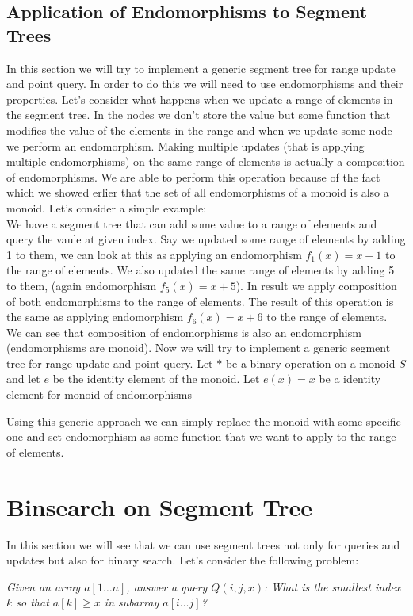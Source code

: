 \documentclass{article}
\begin{document}
\subsection{Application of Endomorphisms to Segment Trees}
In this section we will try to implement a generic segment tree for range update and point query.
In order to do this we will need to use endomorphisms and their properties.
Let's consider what happens when we update a range of elements in the segment tree.
In the nodes we don't store the value but some function that modifies the value of the elements in the range and
when we update some node we perform an endomorphism.
Making multiple updates (that is applying multiple endomorphisms) on the same range of elements 
is actually a composition of endomorphisms.
We are able to perform this operation because of the fact which we showed erlier that the set of all endomorphisms of a monoid is also a monoid.
Let's consider a simple example: \\
We have a segment tree that can add some value to a range of elements and query the vaule at given index.
Say we updated some range of elements by adding 1 to them,
we can look at this as applying an endomorphism \(f_1(x) = x + 1\) to the range of elements.
We also updated the same range of elements by adding 5 to them, (again endomorphism \(f_5(x) = x + 5\)).
In result we apply composition of both endomorphisms to the range of elements.
The result of this operation is the same as applying endomorphism \(f_6(x) = x + 6\) to the range of elements.
We can see that composition of endomorphisms is also an endomorphism (endomorphisms are monoid).
Now we will try to implement a generic segment tree for range update and point query.
Let \(\ast\) be a binary operation on a monoid \(S\) and let \(e\) be the identity element of the monoid.
Let \(e(x) = x\) be a identity element for monoid of endomorphisms

\vspace{0.1cm}
\FloatBarrier
Using this generic approach we can simply replace the monoid with some specific one and
set endomorphism as some function that we want to apply to the range of elements.

\section{Binsearch on Segment Tree}
In this section we will see that we can use segment trees not only for queries and updates but also for
binary search. Let's consider the following problem:
\begin{center}
    \textit{Given an array $a[1 \ldots n]$, answer a query $Q(i, j, x)$: What is the smallest index $k$ so that $a[k] \geq x$ in subarray  $a[i \ldots j]$?}\\[1ex]
\end{center}
\end{document}
